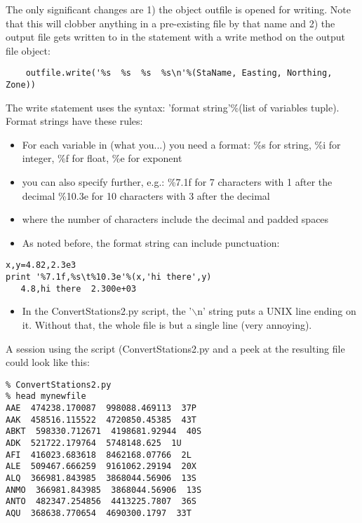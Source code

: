 {\noindent
The only significant changes are 1) the object {\color{blue}outfile} is opened for writing. Note that this will clobber anything in a pre-existing file by that name and 2) the output file gets written to in the statement with a write method on the output file object:
{\singlespacing \color{blue} \begin{verbatim}
    outfile.write('%s  %s  %s  %s\n'%(StaName, Easting, Northing, Zone))
\end{verbatim}}
\noindent
The write statement uses the syntax:  'format string'\%(list of variables tuple).  Format strings have these rules:

\begin{itemize}
\item For each variable in (what you...) you need a format:  \%s for string, \%i for integer, \%f for float, \%e for exponent
\item you can also specify further, e.g.:
\%7.1f  for 7 characters with 1 after the decimal
\%10.3e for 10 characters with 3 after the decimal
\item where the number of characters include the decimal and padded spaces
\item As noted before, the format string can include punctuation:
\end{itemize}
{\singlespacing \color{blue} \begin{verbatim}
x,y=4.82,2.3e3
print '%7.1f,%s\t%10.3e'%(x,'hi there',y)
   4.8,hi there	 2.300e+03
\end{verbatim}}
\begin{itemize}
\item In the {\color{blue}ConvertStations2.py} script, the  '$\backslash$n' string puts a UNIX line ending on it.  Without that, the whole file is but a single line (very annoying).  
\end{itemize}




\noindent A session using the script ({\color{blue}ConvertStations2.py} and a peek at the resulting file could look like this:
{\singlespacing \color{blue} \begin{verbatim}
% ConvertStations2.py
% head mynewfile 
AAE  474238.170087  998088.469113  37P
AAK  458516.115522  4720850.45385  43T
ABKT  598330.712671  4198681.92944  40S
ADK  521722.179764  5748148.625  1U
AFI  416023.683618  8462168.07766  2L
ALE  509467.666259  9161062.29194  20X
ALQ  366981.843985  3868044.56906  13S
ANMO  366981.843985  3868044.56906  13S
ANTO  482347.254856  4413225.7807  36S
AQU  368638.770654  4690300.1797  33T
\end{verbatim}}

}
